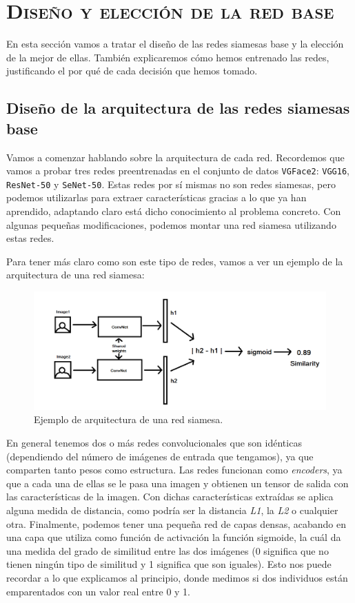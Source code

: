 \documentclass[11pt,a4paper]{article}
\begin{document}
\section{\textsc{Diseño y elección de la red base}}

En esta sección vamos a tratar el diseño de las redes siamesas base y la elección de la mejor de ellas.
También explicaremos cómo hemos entrenado las redes, justificando el por qué de cada decisión que hemos
tomado.

\subsection{Diseño de la arquitectura de las redes siamesas base}

Vamos a comenzar hablando sobre la arquitectura de cada red. Recordemos que vamos a probar tres redes
preentrenadas en el conjunto de datos \texttt{VGFace2}: \texttt{VGG16}, \texttt{ResNet-50} y \texttt{SeNet-50}.
Estas redes por sí mismas no son redes siamesas, pero podemos utilizarlas para extraer características gracias
a lo que ya han aprendido, adaptando claro está dicho conocimiento al problema concreto. Con algunas pequeñas
modificaciones, podemos montar una red siamesa utilizando estas redes.

Para tener más claro como son este tipo de redes, vamos a ver un ejemplo de la arquitectura de una red
siamesa:

\begin{figure}[H]
    \centering
    \includegraphics[scale=0.3]{img/siamese-net-arch.png}
    \caption{Ejemplo de arquitectura de una red siamesa.}
    \label{fig:siamese-net-arch}
\end{figure}

En general tenemos dos o más redes convolucionales que son idénticas (dependiendo del número de imágenes de
entrada que tengamos), ya que comparten tanto pesos como estructura. Las redes funcionan como \textit{encoders},
ya que a cada una de ellas se le pasa una imagen y obtienen un tensor de salida con las características de la imagen.
Con dichas características extraídas se aplica alguna medida de distancia, como podría
ser la distancia \textit{L1}, la \textit{L2} o cualquier otra. Finalmente, podemos tener una pequeña red
de capas densas, acabando en una capa que utiliza como función de activación la función sigmoide, la cuál
da una medida del grado de similitud entre las dos imágenes (0 significa que no tienen ningún tipo de similitud
y 1 significa que son iguales). Esto nos puede recordar a lo que explicamos al principio, donde medimos
si dos individuos están emparentados con un valor real entre 0 y 1.
\end{document}
